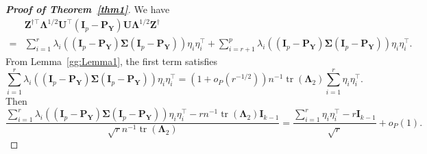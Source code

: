 \documentclass[10pt]{book}
\theoremstyle{definition}
\DeclareMathOperator{\mytr}{tr}
\newcommand{\bZ}{\mathbf{Z}}
\newcommand{\bP}{\mathbf{P}}
\newcommand{\bY}{\mathbf{Y}}
\newcommand{\bI}{\mathbf{I}}
\newcommand{\bU}{\mathbf{U}}
\newcommand{\bfsym}[1]{\ensuremath{\boldsymbol{#1}}}
\def\bLambda {\bfsym {\Lambda}}
\def\bSigma {\bfsym {\Sigma}}
\begin{document}
\begin{proof}[\textbf{Proof of Theorem~\ref{thm1}}]
    We have
    \begin{equation*}
        \begin{split}
&\bZ^{\dagger \top} \bLambda^{1/2}\bU^\top (\bI_p-\bP_{\bY})\bU\bLambda^{1/2}\bZ^{\dagger}
\\
=&
\sum_{i=1}^r \lambda_i ( (\bI_p-\bP_{\bY})\bSigma (\bI_p-\bP_{\bY}))\eta_i \eta_i^\top
+
\sum_{i=r+1}^p \lambda_i ( (\bI_p-\bP_{\bY})\bSigma (\bI_p-\bP_{\bY}))\eta_i \eta_i^\top.
        \end{split}
    \end{equation*}
    From Lemma~\ref{gg:Lemma1}, the first term satisfies
    \begin{equation*}
\sum_{i=1}^r \lambda_i ( (\bI_p-\bP_{\bY})\bSigma (\bI_p-\bP_{\bY}))\eta_i \eta_i^\top
=
(1+o_P(r^{-1/2}))n^{-1}\mytr(\bLambda_2)\sum_{i=1}^r \eta_i \eta_i^\top.
    \end{equation*}
    Then
    \begin{equation}\label{lushang1}
        \frac{
\sum_{i=1}^r \lambda_i ( (\bI_p-\bP_{\bY})\bSigma (\bI_p-\bP_{\bY}))\eta_i \eta_i^\top
-rn^{-1}\mytr(\bLambda_2)\bI_{k-1}
}{
    \sqrt r n^{-1}\mytr(\bLambda_2)
}
=\frac{\sum_{i=1}^r \eta_i \eta_i^\top- r\bI_{k-1}}{\sqrt r}
+o_P(1).
    \end{equation}



\end{proof}
\end{document}
